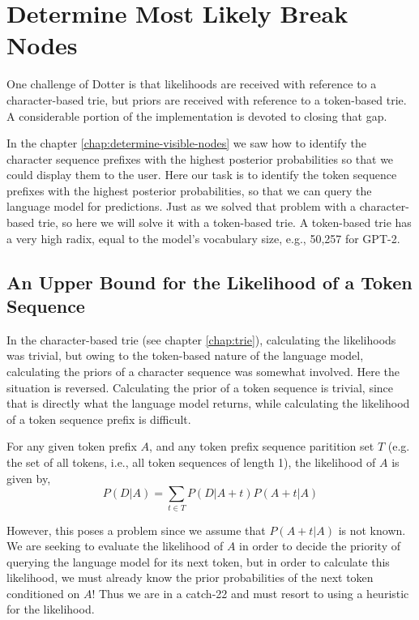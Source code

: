 \chapter{Determine Most Likely Break Nodes}
\label{chap:determine-most-likely-break-nodes}

One challenge of Dotter is that likelihoods are received with reference to a character-based trie,
but priors are received with reference to a token-based trie. A considerable portion of the implementation
is devoted to closing that gap.

In the chapter \ref{chap:determine-visible-nodes} we saw how to identify the character sequence prefixes with the highest
posterior probabilities so that we could display them to the user. Here our task is to identify the token sequence prefixes
with the highest posterior probabilities, so that we can query the language model for predictions.
Just as we solved that problem with a character-based trie, so here we will solve it with a token-based trie.
A token-based trie has a very high radix, equal to the model's vocabulary size, e.g., 50,257 for GPT-2.

\section{An Upper Bound for the Likelihood of a Token Sequence}

In the character-based trie (see chapter \ref{chap:trie}), calculating the likelihoods was trivial, but owing to the token-based nature of the
language model, calculating the priors of a character sequence was somewhat involved. Here the situation is reversed.
Calculating the prior of a token sequence is trivial, since that is directly what the language model returns,
while calculating the likelihood of a token sequence prefix is difficult.

For any given token prefix $A$, and any token prefix sequence paritition set $T$ (e.g. the set of all tokens, i.e., all token sequences of length 1),
the likelihood of $A$ is given by,
$$
P(D | A) = \sum_{t \in T} P(D | A+t) P(A+t | A)
$$

However, this poses a problem since we assume that $P(A+t | A)$ is not known.
We are seeking to evaluate the likelihood of $A$ in order to decide the priority of querying the language model for its next token,
but in order to calculate this likelihood, we must already know the prior probabilities of the next token conditioned on $A$!
Thus we are in a catch-22 and must resort to using a heuristic for the likelihood.

